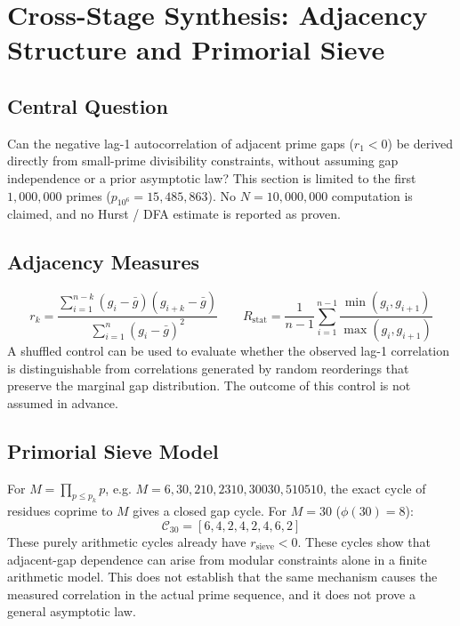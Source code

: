 \documentclass[12pt,a4paper]{article}
\begin{document}
\section{Cross-Stage Synthesis: Adjacency Structure and Primorial Sieve}
\subsection{Central Question}
Can the negative lag-1 autocorrelation of adjacent prime gaps ($r_1 < 0$) be derived directly from small-prime divisibility constraints, without assuming gap independence or a prior asymptotic law? This section is limited to the first $1,000,000$ primes ($p_{10^6} = 15,485,863$). No $N = 10,000,000$ computation is claimed, and no Hurst / DFA estimate is reported as proven.

\subsection{Adjacency Measures}
\[
r_k = \frac{\sum_{i=1}^{n-k} (g_i - \bar{g})(g_{i+k} - \bar{g})}{\sum_{i=1}^{n} (g_i - \bar{g})^2}
\qquad
R_{\text{stat}} = \frac{1}{n-1} \sum_{i=1}^{n-1} \frac{\min(g_i, g_{i+1})}{\max(g_i, g_{i+1})}
\]
A shuffled control can be used to evaluate whether the observed lag-1 correlation is distinguishable from correlations generated by random reorderings that preserve the marginal gap distribution. The outcome of this control is not assumed in advance.

\subsection{Primorial Sieve Model}
For $M = \prod_{p \le p_k} p$, e.g. $M = 6, 30, 210, 2310, 30030, 510510$, the exact cycle of residues coprime to $M$ gives a closed gap cycle. For $M = 30$ ($\phi(30) = 8$):
\[
\mathcal{C}_{30} = [6, 4, 2, 4, 2, 4, 6, 2]
\]
These purely arithmetic cycles already have $r_{\text{sieve}} < 0$. These cycles show that adjacent-gap dependence can arise from modular constraints alone in a finite arithmetic model. This does not establish that the same mechanism causes the measured correlation in the actual prime sequence, and it does not prove a general asymptotic law.


\end{document}
